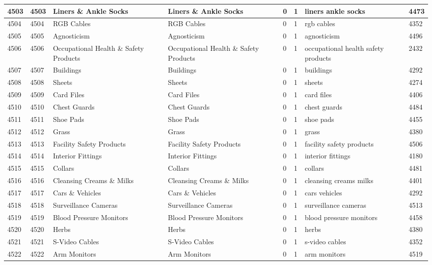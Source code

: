 \begin{longtable}{|l|l|l|l|l|l|l|l|}
4503 & 4503 & Liners \& Ankle Socks & Liners \& Ankle Socks & 0 & 1 & liners ankle socks & 4473 \\ \hline 
4504 & 4504 & RGB Cables & RGB Cables & 0 & 1 & rgb cables & 4352 \\ \hline 
4505 & 4505 & Agnosticism & Agnosticism & 0 & 1 & agnosticism & 4496 \\ \hline 
4506 & 4506 & Occupational Health \& Safety Products & Occupational Health \& Safety Products & 0 & 1 & occupational health safety products & 2432 \\ \hline 
4507 & 4507 & Buildings & Buildings & 0 & 1 & buildings & 4292 \\ \hline 
4508 & 4508 & Sheets & Sheets & 0 & 1 & sheets & 4274 \\ \hline 
4509 & 4509 & Card Files & Card Files & 0 & 1 & card files & 4406 \\ \hline 
4510 & 4510 & Chest Guards & Chest Guards & 0 & 1 & chest guards & 4484 \\ \hline 
4511 & 4511 & Shoe Pads & Shoe Pads & 0 & 1 & shoe pads & 4455 \\ \hline 
4512 & 4512 & Grass & Grass & 0 & 1 & grass & 4380 \\ \hline 
4513 & 4513 & Facility Safety Products & Facility Safety Products & 0 & 1 & facility safety products & 4506 \\ \hline 
4514 & 4514 & Interior Fittings & Interior Fittings & 0 & 1 & interior fittings & 4180 \\ \hline 
4515 & 4515 & Collars & Collars & 0 & 1 & collars & 4481 \\ \hline 
4516 & 4516 & Cleansing Creams \& Milks & Cleansing Creams \& Milks & 0 & 1 & cleansing creams milks & 4401 \\ \hline 
4517 & 4517 & Cars \& Vehicles & Cars \& Vehicles & 0 & 1 & cars vehicles & 4292 \\ \hline 
4518 & 4518 & Surveillance Cameras & Surveillance Cameras & 0 & 1 & surveillance cameras & 4513 \\ \hline 
4519 & 4519 & Blood Pressure Monitors & Blood Pressure Monitors & 0 & 1 & blood pressure monitors & 4458 \\ \hline 
4520 & 4520 & Herbs & Herbs & 0 & 1 & herbs & 4380 \\ \hline 
4521 & 4521 & S-Video Cables & S-Video Cables & 0 & 1 & s-video cables & 4352 \\ \hline 
4522 & 4522 & Arm Monitors & Arm Monitors & 0 & 1 & arm monitors & 4519 \\ \hline 

\end{longtable}
